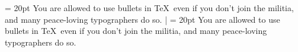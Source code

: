 \example
\parindent = 20pt \textindent{\raise 1pt\hbox{$\bullet$}}%
You are allowed to use bullets in \TeX\ even if
you don't join the militia, and many peace-loving
typographers do so.
|
\produces
\parindent = 20pt \textindent{\raise 1pt\hbox{$\bullet$}}%
You are allowed to use bullets in \TeX\ even if
you don't join the militia, and many peace-loving
typographers do so.
\endexample\enddesc



